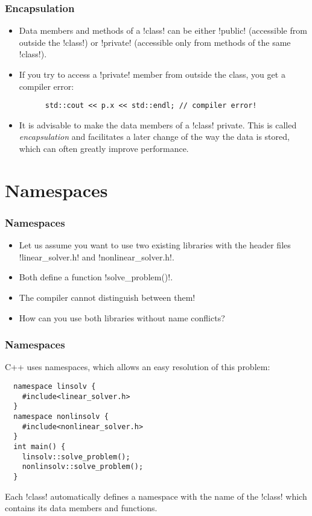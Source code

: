 \begin{frame}[fragile]
  \frametitle{Encapsulation}
  \begin{itemize}
  \item Data members and methods of a \inline!class! can be either \inline!public! (accessible from outside the \inline!class!) or \inline!private! (accessible only from methods of the same \inline!class!).
  \item If you try to access a \inline!private! member from outside the class, you get a compiler error:
    \begin{lstlisting}
      std::cout << p.x << std::endl; // compiler error!
    \end{lstlisting}
  \item It is advisable to make the data members of a \inline!class! private. This is called \emph{encapsulation} and facilitates a later change of the way the data is stored, which can often greatly improve performance. 
  \end{itemize}
\end{frame}

\section{Namespaces}

\begin{frame}[fragile]
  \frametitle<presentation>{Namespaces}
  \begin{itemize}
  \item Let us assume you want to use two existing libraries with the header files \inline!linear_solver.h! and \inline!nonlinear_solver.h!. 
  \item Both define a function \inline!solve_problem()!. 
  \item The compiler cannot distinguish between them!
  \item How can you use both libraries without name conflicts? 
  \end{itemize}
  
\end{frame}

\begin{frame}[fragile]
  \frametitle<presentation> {Namespaces}
  C++ uses namespaces, which allows an easy resolution of this problem:
\begin{lstlisting}
  namespace linsolv {
    #include<linear_solver.h>
  }
  namespace nonlinsolv {
    #include<nonlinear_solver.h>
  }
  int main() {
    linsolv::solve_problem();
    nonlinsolv::solve_problem();
  }
\end{lstlisting}
Each \inline!class! automatically defines a namespace with the name of the \inline!class! which contains its data members and functions.
\end{frame}

